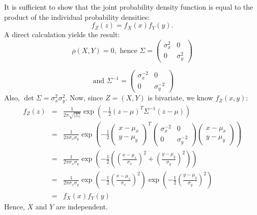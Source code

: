 It is sufficient to show that the joint probability density function is equal to the product 
of the individual probability densities:
\[
    f_{Z}(z) = f_X(x)f_Y(y).
\]
A direct calculation yields the result:
\[
    \rho(X,Y) = 0, \textrm{ hence } \Sigma = \begin{pmatrix}
                                               \sigma_x^2 & 0   \\
                                               0          & \sigma_y^2
                                             \end{pmatrix}
\]

\[
    \textrm{ and } \Sigma^{-1} = \begin{pmatrix}
                                   \sigma_x^{-2} & 0   \\
                                   0          & \sigma_y^{-2}
                                 \end{pmatrix}
\]
Also, $\det\Sigma = \sigma_x^2 \sigma_y^2$. Now, since $Z=(X,Y)$ is bivariate, we know $f_Z(x,y)$:
\begin{eqnarray*}
    f_Z(z) &=& \frac{1}{2\pi\sqrt{|\Sigma|}} \exp\left(-\frac{1}{2}(z-\mu)^T\Sigma^{-1}(z-\mu)\right)\\
           &=& \frac{1}{2\pi\sigma_x \sigma_y} \exp\left(-\frac{1}{2} \begin{pmatrix}x-\mu_x \\ y-\mu_y\end{pmatrix}^T \begin{pmatrix}\sigma_x^{-2} & 0 \\ 0 & \sigma_y^{-2}\end{pmatrix}\begin{pmatrix}x-\mu_x \\ y-\mu_y\end{pmatrix}\right) \\
           &=& \frac{1}{2\pi\sigma_x \sigma_y} \exp\left(-\frac{1}{2} \left(\left(\frac{x-\mu_x}{\sigma_x}\right)^2 + \left(\frac{y-\mu_y}{\sigma_y}\right)^2\right)\right) \\
           &=& \frac{1}{2\pi\sigma_x \sigma_y} \exp\left(-\frac{1}{2} \left(\frac{x-\mu_x}{\sigma_x}\right)^2 \right)\exp \left( -\frac{1}{2}\left(\frac{y-\mu_y}{\sigma_y}\right)^2\right) \\
           &=& f_X(x)f_Y(y) 
\end{eqnarray*}
Hence, $X$ and $Y$ are independent.
